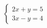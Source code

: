 \documentclass[preview]{standalone}
\begin{document}
\begin{align*}
\begin{cases} 2x + y = 5 \\ 3x - y = 4 \end{cases}
\end{align*}
\end{document}
